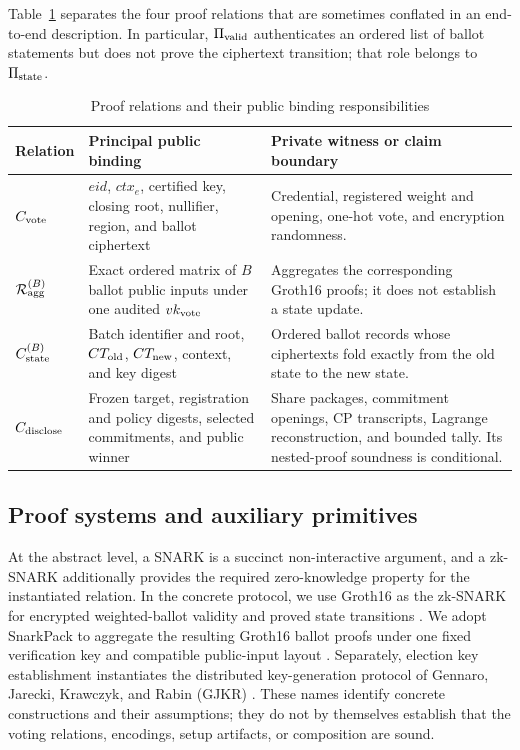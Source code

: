 \documentclass[pdflatex,sn-mathphys-num]{sn-jnl}%
\theoremstyle{thmstyleone}%
\theoremstyle{thmstyletwo}%
\theoremstyle{thmstylethree}%
\begin{document}
Table~\ref{tab:proof-relations} separates the four proof relations that are
sometimes conflated in an end-to-end description.  In particular,
$\Pi_{\rm valid}$ authenticates an ordered list of ballot statements but does
not prove the ciphertext transition; that role belongs to
$\Pi_{\rm state}$.

\begin{table}[htbp]
\centering
\caption{Proof relations and their public binding responsibilities}
\label{tab:proof-relations}
\small
\begin{tabular}{p{}p{}p{}}
\toprule
Relation & Principal public binding & Private witness or claim boundary \\
\midrule
$C_{\rm vote}$ & $eid$, $ctx_e$, certified key, closing root, nullifier, region, and ballot ciphertext & Credential, registered weight and opening, one-hot vote, and encryption randomness. \\
$\mathcal R_{\rm agg}^{(B)}$ & Exact ordered matrix of $B$ ballot public inputs under one audited $vk_{\rm vote}$ & Aggregates the corresponding Groth16 proofs; it does not establish a state update. \\
$C_{\rm state}^{(B)}$ & Batch identifier and root, $CT_{\rm old}$, $CT_{\rm new}$, context, and key digest & Ordered ballot records whose ciphertexts fold exactly from the old state to the new state. \\
$C_{\rm disclose}$ & Frozen target, registration and policy digests, selected commitments, and public winner & Share packages, commitment openings, CP transcripts, Lagrange reconstruction, and bounded tally.  Its nested-proof soundness is conditional. \\
\bottomrule
\end{tabular}
\end{table}

\subsection{Proof systems and auxiliary primitives}\label{sec2.2}

At the abstract level, a SNARK is a succinct non-interactive argument, and a
zk-SNARK additionally provides the required zero-knowledge property for the
instantiated relation.  In the concrete protocol, we use Groth16 as the
zk-SNARK for encrypted weighted-ballot validity and proved state transitions
\cite{bib32}.  We adopt SnarkPack to aggregate the resulting Groth16 ballot
proofs under one fixed verification key and compatible public-input layout
\cite{bib128}.  Separately, election key establishment instantiates the
distributed key-generation protocol of Gennaro, Jarecki, Krawczyk, and Rabin
(GJKR) \cite{bib133}.  These names identify concrete constructions and their
assumptions; they do not by themselves establish that the voting relations,
encodings, setup artifacts, or composition are sound.
\end{document}
